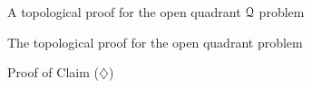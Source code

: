 \documentclass[11pt, a4paper, english, twoside, notitlepage, openright]{report}
\begin{document}
\begin{chapter}{A topological proof for the open quadrant $\mathcal{Q}$ problem}
\begin{section}{The topological proof for the open quadrant problem}
\begin{subsection}{Proof of Claim ($\diamondsuit$)}
\begin{constr}
\begin{center}
\end{center}

\em
\end{constr}

\end{subsection}
\end{section}
\end{chapter}
\end{document}
